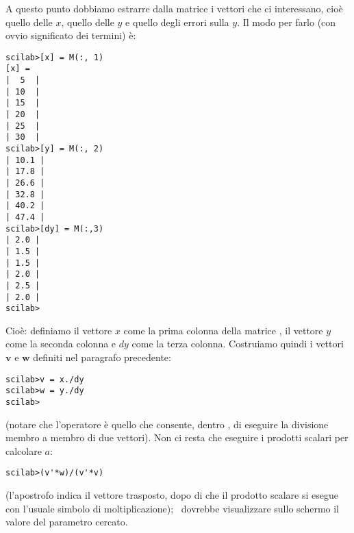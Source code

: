 A questo punto dobbiamo estrarre dalla matrice i vettori che ci interessano,
cio\`e quello delle $x$, quello delle $y$ e quello degli errori sulla $y$.
Il modo per farlo (con ovvio significato dei termini) \`e:
\begin{verbatim}
scilab>[x] = M(:, 1)
[x] =
|  5  |
| 10  |
| 15  |
| 20  |
| 25  |
| 30  |
scilab>[y] = M(:, 2)
| 10.1 |
| 17.8 |
| 26.6 |
| 32.8 |
| 40.2 |
| 47.4 |
scilab>[dy] = M(:,3)
| 2.0 |
| 1.5 |
| 1.5 |
| 2.0 |
| 2.5 |
| 2.0 |
scilab>
\end{verbatim}
Cio\`e: definiamo il vettore $x$ come la prima colonna della matrice ,
il vettore $y$ come la seconda colonna e $dy$ come la terza colonna.
Costruiamo quindi i vettori $\mathbf{v}$ e $\mathbf{w}$ definiti nel paragrafo
precedente:
\begin{verbatim}
scilab>v = x./dy
scilab>w = y./dy
scilab>
\end{verbatim}
(notare che l'operatore  \`e quello che consente, dentro \scilab,
di eseguire la divisione membro a membro di due vettori).
Non ci resta che eseguire i prodotti scalari per calcolare $a$:
\begin{verbatim}
scilab>(v'*w)/(v'*v)
\end{verbatim}
(l'apostrofo  indica il vettore trasposto, dopo di che il prodotto
scalare si esegue con l'usuale simbolo di moltiplicazione); \scilab\ dovrebbe
visualizzare sullo schermo il valore del parametro cercato.
